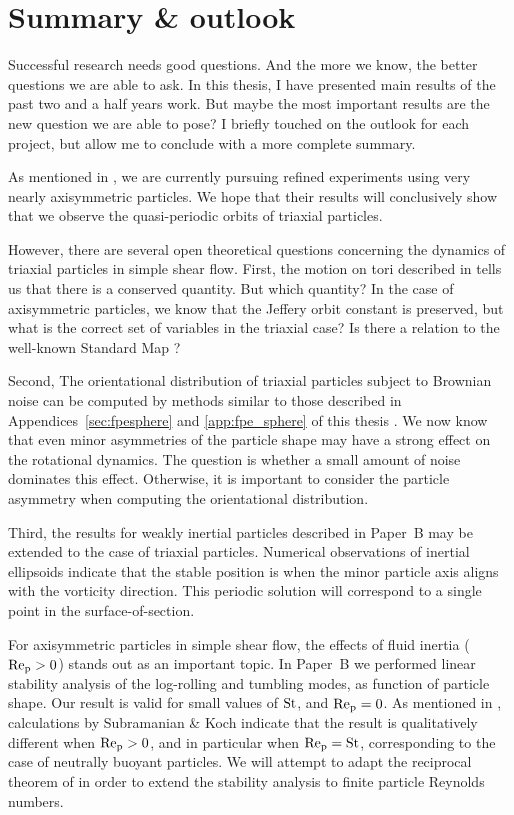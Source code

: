 \documentclass[thesis.tex]{subfiles}
\begin{document}
\chapter{Summary \& outlook}
Successful research needs good questions. And the more we know, the better questions we are able to ask.
In this thesis, I have presented main results of the past two and a half years work. But maybe the most important results are the new question we are able to pose? I briefly touched on the outlook for each project, but allow me to conclude with a more complete summary.

As mentioned in , we are currently pursuing refined experiments using very nearly axisymmetric particles. We hope that their results will conclusively show that we observe the quasi-periodic orbits of triaxial particles.

However, there are several open theoretical questions concerning the dynamics of triaxial particles in simple shear flow. 
First, the motion on tori described in  tells us that there is a conserved quantity. But which quantity? In the case of axisymmetric particles, we know that the Jeffery orbit constant is preserved, but what is the correct set of variables in the triaxial case? Is there a relation to the well-known Standard Map \cite{ott2002, strogatz2000}? 

Second, The orientational distribution of triaxial particles subject to Brownian noise can be computed by methods similar to those described in Appendices~\ref{sec:fpesphere} and \ref{app:fpe_sphere} of this thesis \cite{favro1960,brenner1972,hubbard1972}. We now know that even minor asymmetries of the particle shape may have a strong effect on the rotational dynamics. The question is whether a small amount of noise dominates this effect. Otherwise, it is important to consider the particle asymmetry when computing the orientational distribution.

Third, the results for weakly inertial particles described in Paper~B may be extended to the case of triaxial particles. Numerical observations of inertial ellipsoids \cite{lundell2011} indicate that the stable position is when the minor particle axis aligns with the vorticity direction. This periodic solution will correspond to a single point in the surface-of-section.

For axisymmetric particles in simple shear flow, the effects of fluid inertia ($\mbox{Re}_{\mathrm p}>0$) stands out as an important topic. In Paper~B we performed linear stability analysis of the log-rolling and tumbling modes, as function of particle shape. Our result is valid for small values of $\mbox{St}$, and $\mbox{Re}_{\mathrm p} =0$. As mentioned in , calculations by Subramanian \& Koch \cite{subramanian2005,subramanian2006} indicate that the result is qualitatively different when $\mbox{Re}_{\mathrm p}>0$, and in particular when $\mbox{Re}_{\mathrm p}=\mbox{St}$, corresponding to the case of neutrally buoyant particles. We will attempt to adapt the reciprocal theorem of \cite{lovalenti1993,subramanian2005,subramanian2006} in order to extend the stability analysis to finite particle Reynolds numbers.
\end{document}
